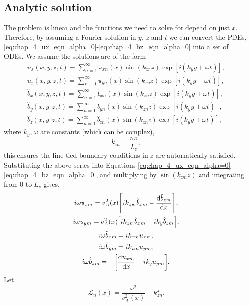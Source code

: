 \subsection{Analytic solution}
\label{sec:chap_4_normal_mode_analytic_solution}

The problem is linear and the functions we need to solve for depend on just $x$. Therefore, by assuming a Fourier solution in $y$, $z$ and $t$ we can convert the PDEs, \eqref{eq:chap_4_ux_eqn_alpha=0}-\eqref{eq:chap_4_bz_eqn_alpha=0} into a set of ODEs.
We assume the solutions are of the form
\begin{gather}
    \label{eq:chap_4_ux_expansion}
    u_x(x,y,z,t) = \sum_{n=1}^\infty u_{xn}(x)\sin(k_{zn}z)\exp[i(k_y y + \omega t)], \\
    u_y(x,y,z,t) = \sum_{n=1}^\infty u_{yn}(x)\sin(k_{zn}z)\exp[i(k_y y + \omega t)], \\
    \hat{b}_x(x,y,z,t) = \sum_{n=1}^\infty \hat{b}_{xn}(x)\sin(k_{zn}z)\exp[i(k_y y + \omega t)], \\
    \hat{b}_y(x,y,z,t) = \sum_{n=1}^\infty \hat{b}_{yn}(x)\sin(k_{zn}z)\exp[i(k_y y + \omega t)], \\
    \label{eq:chap_4_bz_expansion}
    \hat{b}_z(x,y,z,t) = \sum_{n=1}^\infty \hat{b}_{zn}(x)\sin(k_{zn}z)\exp[i(k_y y + \omega t)],
\end{gather}
where $k_y$, $\omega$ are constants (which can be complex),
\begin{equation}
    k_{zn} = \frac{n\pi}{L_z},
\end{equation}
this ensures the line-tied boundary conditions in $z$ are automatically satisfied. Substituting the above series into Equations \eqref{eq:chap_4_ux_eqn_alpha=0}-\eqref{eq:chap_4_bz_eqn_alpha=0}, and multiplying by $\sin(k_{zm}z)$ and integrating from $0$ to $L_z$ gives.
\begin{gather}
    i\omega u_{xm} = v_A^2(x)\qty[ik_{zm} \hat{b}_{xm} - \dv{\hat{b}_{zm}}{x}],\\
    i\omega u_{ym} = v_A^2(x)\qty[ik_{zm} \hat{b}_{xm} - ik_y \hat{b}_{zm}],\\
    i\omega \hat{b}_{xm} = ik_{zm}u_{xm},\\
    i\omega \hat{b}_{ym} = ik_{zm}u_{ym},\\
    \label{eq:chap_4_bz_eqn2_alpha=0}
    i\omega \hat{b}_{zm} = -\qty[\dv{u_{xm}}{x}+ ik_yu_{ym}].
\end{gather}
Let
\begin{equation}
    \mathcal{L}_n(x) = \frac{\omega^2}{v_A^2(x)} - k_{zn}^2.
\end{equation}
